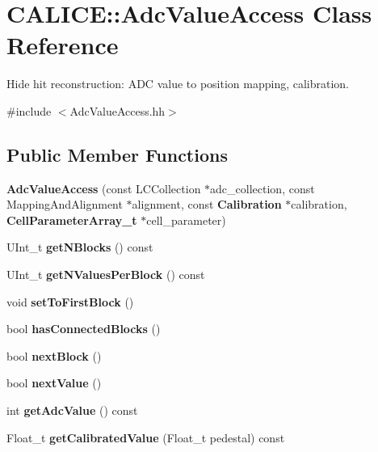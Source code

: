 \section{CALICE::AdcValueAccess Class Reference}
\label{classCALICE_1_1AdcValueAccess}


Hide hit reconstruction: ADC value to position mapping, calibration.  


{\ttfamily \#include $<$AdcValueAccess.hh$>$}\subsection*{Public Member Functions}
\begin{DoxyCompactItemize}
\item 
{\bfseries AdcValueAccess} (const LCCollection $\ast$adc\_\-collection, const MappingAndAlignment $\ast$alignment, const {\bf Calibration} $\ast$calibration, {\bf CellParameterArray\_\-t} $\ast$cell\_\-parameter)\label{classCALICE_1_1AdcValueAccess_a111487e619a4de8f38932de049576f7d}

\item 
UInt\_\-t {\bfseries getNBlocks} () const \label{classCALICE_1_1AdcValueAccess_a86ee09caed462571ad485853d674c0bb}

\item 
UInt\_\-t {\bfseries getNValuesPerBlock} () const \label{classCALICE_1_1AdcValueAccess_ae4f2b137243bd9c72bc73a67332ae27c}

\item 
void {\bfseries setToFirstBlock} ()\label{classCALICE_1_1AdcValueAccess_a773c54a8ff1f477d51dd94cf64d21a38}

\item 
bool {\bfseries hasConnectedBlocks} ()\label{classCALICE_1_1AdcValueAccess_afc9447b6f9ee052051c53214f959973a}

\item 
bool {\bfseries nextBlock} ()\label{classCALICE_1_1AdcValueAccess_a508cdb3b31faf94cff57c4a0b7b2605d}

\item 
bool {\bfseries nextValue} ()\label{classCALICE_1_1AdcValueAccess_ae4b4f7aabbcd9b715b145ae6f77e64a5}

\item 
int {\bfseries getAdcValue} () const \label{classCALICE_1_1AdcValueAccess_a178d1b500b340c66862ca31408058cf4}

\item 
Float\_\-t {\bfseries getCalibratedValue} (Float\_\-t pedestal) const \label{classCALICE_1_1AdcValueAccess_abfe8b2520316fdaca87fb1643039b706}


\end{DoxyCompactItemize}

